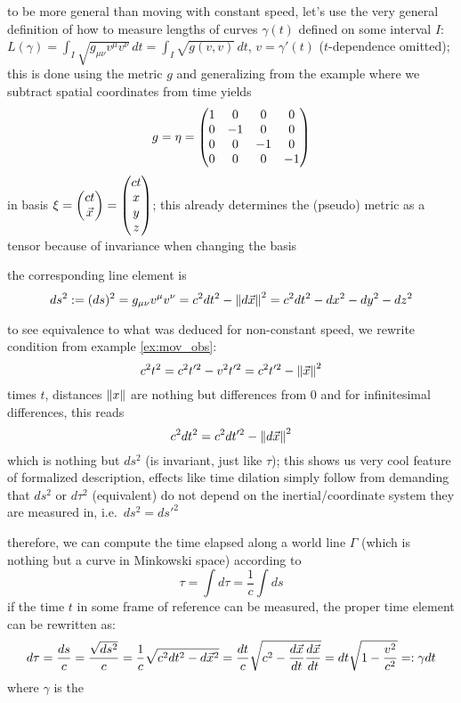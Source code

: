 to be more general than moving with constant speed, let's use the very general definition of how to measure lengths of curves $\gamma(t)$ defined on some interval $I$: $L(\gamma) = \int_I \sqrt{g_{\mu \nu} v^\mu v^\nu} \, dt = \int_I \sqrt{g(v, v)} \, dt$, $v = \gamma'(t)$ ($t$-dependence omitted); this is done using the metric $g$ and generalizing from the example where we subtract spatial coordinates from time yields
\begin{equation}
g = \eta = \mqty(1 & 0 & 0 & 0 \\ 0 & -1 & 0 & 0 \\ 0 & 0 & -1 & 0 \\ 0 & 0 & 0 & -1)
\end{equation}
in basis $\mathbf{\xi} = \mqty(c t \\ \vec{x}) = \mqty(c t \\ x \\ y \\ z)$; this already determines the (pseudo) metric as a tensor because of invariance when changing the basis

the corresponding line element is
\begin{equation}
ds^2 := (ds)^2 = g_{\mu \nu} v^\mu v^\nu = c^2 dt^2 - \norm{d\vec{x}}^2 = c^2 dt^2 - dx^2 - dy^2 - dz^2
\end{equation}


to see equivalence to what was deduced for non-constant speed, we rewrite condition from example \ref{ex:mov_obs}:
\begin{equation*}
c^2 t^2 = c^2 t'^2 - v^2 t'^2 = c^2 t'^2 - \norm{\vec{x}}^2
\end{equation*}
times $t$, distances $\norm{x}$ are nothing but differences from $0$ and for infinitesimal differences, this reads
\begin{equation*}
c^2 dt^2 = c^2 dt'^2 - \norm{d\vec{x}}^2
\end{equation*}
which is nothing but $ds^2$ (is invariant, just like $\tau$); this shows us very cool feature of formalized description, effects like time dilation simply follow from demanding that $ds^2$ or $d\tau^2$ (equivalent) do not depend on the inertial/coordinate system they are measured in, i.e.~$ds^2 = ds'^2$



therefore, we can compute the time elapsed along a world line $\Gamma$ (which is nothing but a curve in Minkowski space) according to
\begin{equation}
\tau = \int d\tau = \frac{1}{c} \int ds
\end{equation}
if the time $t$ in some frame of reference can be measured, the proper time element can be rewritten as:
\begin{equation}
d\tau = \frac{ds}{c} = \frac{\sqrt{ds^2}}{c} = \frac{1}{c} \sqrt{c^2 dt^2 - d\vec{x}^2} = \frac{dt}{c} \sqrt{c^2 - \dv{\vec{x}}{t} \dv{\vec{x}}{t}} = dt \sqrt{1 - \frac{v^2}{c^2}} =: \gamma dt
\end{equation}
where $\gamma$ is the 


